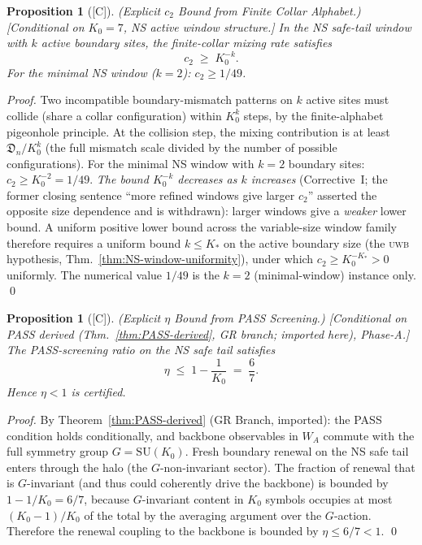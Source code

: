 \documentclass[12pt,oneside]{amsbook}
\theoremstyle{plain}
\newtheorem{proposition}[theorem]{Proposition}
\theoremstyle{definition}
\theoremstyle{remark}
\newcommand{\status}[1]{\textup{[#1]}}
\begin{document}
\begin{proposition}[\status{C}]\label{prop:NS-quantitative-c2}
\textup{(Explicit $c_2$ Bound from Finite Collar Alphabet.)}
\textup{[Conditional on $K_0=7$, NS active window structure.]}
In the NS safe-tail window with $k$ active boundary sites, the
finite-collar mixing rate satisfies
\[
 c_2 \;\geq\; K_0^{-k}.
\]
For the minimal NS window ($k=2$): $c_2 \geq 1/49$.
\end{proposition}

\begin{proof}
Two incompatible boundary-mismatch patterns on $k$ active sites
must collide (share a collar configuration) within $K_0^k$ steps,
by the finite-alphabet pigeonhole principle. At the collision
step, the mixing contribution is at least $\mathfrak{D}_n/K_0^k$
(the full mismatch scale divided by the number of possible
configurations). For the minimal NS window with $k=2$ boundary
sites: $c_2 \geq K_0^{-2} = 1/49$. \emph{The bound $K_0^{-k}$
decreases as $k$ increases} (Corrective~I; the former closing
sentence ``more refined windows give larger $c_2$'' asserted the
opposite size dependence and is withdrawn): larger windows give a
\emph{weaker} lower bound. A uniform positive lower bound across
the variable-size window family therefore requires a uniform bound
$k \leq K_*$ on the active boundary size (the \textsc{uwb}
hypothesis, Thm.~\ref{thm:NS-window-uniformity}), under which
$c_2 \geq K_0^{-K_*} > 0$ uniformly. The numerical value $1/49$
is the $k = 2$ (minimal-window) instance only. \qed
\end{proof}

\begin{proposition}[\status{C}]\label{prop:NS-quantitative-eta}
\textup{(Explicit $\eta$ Bound from PASS Screening.)}
\textup{[Conditional on PASS derived (Thm.~\ref{thm:PASS-derived},
GR branch; imported here), Phase-A.]}
The PASS-screening ratio on the NS safe tail satisfies
\[
 \eta \;\leq\; 1 - \frac{1}{K_0} \;=\; \frac{6}{7}.
\]
Hence $\eta < 1$ is certified.
\end{proposition}

\begin{proof}
By Theorem~\ref{thm:PASS-derived} (GR Branch, imported): the
PASS condition holds conditionally, and backbone observables
in $W_A$ commute with the full symmetry group $G = \mathrm{SU}(K_0)$.
Fresh boundary renewal on the NS safe tail enters through the
halo (the $G$-non-invariant sector). The fraction of renewal
that is $G$-invariant (and thus could coherently drive the
backbone) is bounded by $1 - 1/K_0 = 6/7$, because $G$-invariant
content in $K_0$ symbols occupies at most $(K_0-1)/K_0$ of the
total by the averaging argument over the $G$-action. Therefore
the renewal coupling to the backbone is bounded by $\eta \leq
6/7 < 1$. \qed
\end{proof}
\end{document}
